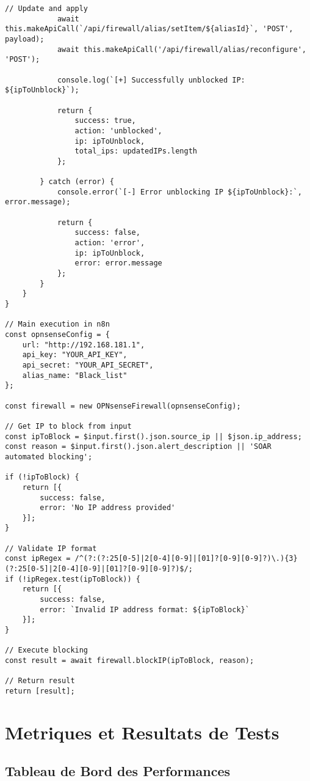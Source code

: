 \begin{lstlisting}[style=jsstyle,caption=Script n8n pour blocage automatique IP OPNsense]
            // Update and apply
            await this.makeApiCall(`/api/firewall/alias/setItem/${aliasId}`, 'POST', payload);
            await this.makeApiCall('/api/firewall/alias/reconfigure', 'POST');

            console.log(`[+] Successfully unblocked IP: ${ipToUnblock}`);
            
            return {
                success: true,
                action: 'unblocked',
                ip: ipToUnblock,
                total_ips: updatedIPs.length
            };

        } catch (error) {
            console.error(`[-] Error unblocking IP ${ipToUnblock}:`, error.message);
            
            return {
                success: false,
                action: 'error',
                ip: ipToUnblock,
                error: error.message
            };
        }
    }
}

// Main execution in n8n
const opnsenseConfig = {
    url: "http://192.168.181.1",
    api_key: "YOUR_API_KEY",
    api_secret: "YOUR_API_SECRET",
    alias_name: "Black_list"
};

const firewall = new OPNsenseFirewall(opnsenseConfig);

// Get IP to block from input
const ipToBlock = $input.first().json.source_ip || $json.ip_address;
const reason = $input.first().json.alert_description || 'SOAR automated blocking';

if (!ipToBlock) {
    return [{
        success: false,
        error: 'No IP address provided'
    }];
}

// Validate IP format
const ipRegex = /^(?:(?:25[0-5]|2[0-4][0-9]|[01]?[0-9][0-9]?)\.){3}(?:25[0-5]|2[0-4][0-9]|[01]?[0-9][0-9]?)$/;
if (!ipRegex.test(ipToBlock)) {
    return [{
        success: false,
        error: `Invalid IP address format: ${ipToBlock}`
    }];
}

// Execute blocking
const result = await firewall.blockIP(ipToBlock, reason);

// Return result
return [result];
\end{lstlisting}

\chapter{Metriques et Resultats de Tests}

\section{Tableau de Bord des Performances}

